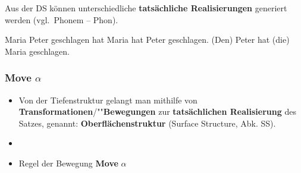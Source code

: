 \begin{frame}


\begin{minipage}[b]{.45\textwidth}
	Aus der DS können unterschiedliche \textbf{tatsächliche Realisierungen} generiert werden (vgl.\ Phonem -- Phon).
\end{minipage}
\begin{minipage}[b]{0.5\textwidth}
\centering
{}
\end{minipage}  


\eal
\ex Maria Peter geschlagen hat
\ex Maria hat Peter geschlagen.
\ex (Den) Peter hat (die) Maria geschlagen.
\zl

\end{frame}


\begin{frame}
\frametitle{Move $\alpha$}

\begin{itemize}
	\item Von der Tiefenstruktur gelangt man mithilfe von \textbf{Transformationen}/""\textbf{Bewegungen} zur \textbf{tatsächlichen Realisierung} des Satzes, genannt: \textbf{Oberflächenstruktur} (Surface Structure, Abk. SS).
	\item[]
	\item Regel der Bewegung \ras \textbf{Move} $\alpha$
\end{itemize}

\end{frame}


